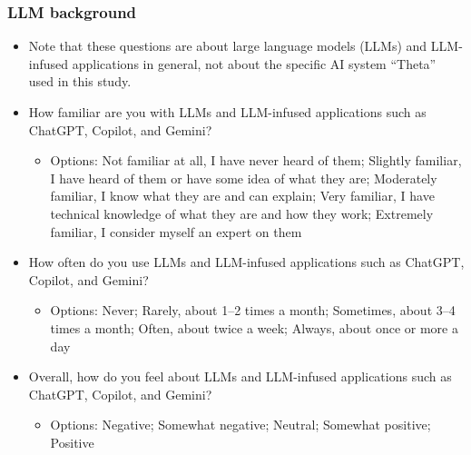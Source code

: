 \subsubsection*{LLM background}
\begin{itemize}
    \item Note that these questions are about large language models (LLMs) and LLM-infused applications in general, not about the specific AI system ``Theta'' used in this study.
    \item How familiar are you with LLMs and LLM-infused applications such as ChatGPT, Copilot, and Gemini?
    \begin{itemize}
        \item Options: Not familiar at all, I have never heard of them; Slightly familiar, I have heard of them or have some idea of what they are; Moderately familiar, I know what they are and can explain; Very familiar, I have technical knowledge of what they are and how they work; Extremely familiar, I consider myself an expert on them
    \end{itemize}
    \item How often do you use LLMs and LLM-infused applications such as ChatGPT, Copilot, and Gemini?
    \begin{itemize}
        \item Options: Never; Rarely, about 1--2 times a month; Sometimes, about 3--4 times a month; Often, about twice a week; Always, about once or more a day
    \end{itemize}
    \item Overall, how do you feel about LLMs and LLM-infused applications such as ChatGPT, Copilot, and Gemini?
    \begin{itemize}
        \item Options: Negative; Somewhat negative; Neutral; Somewhat positive; Positive
    \end{itemize}
\end{itemize}


